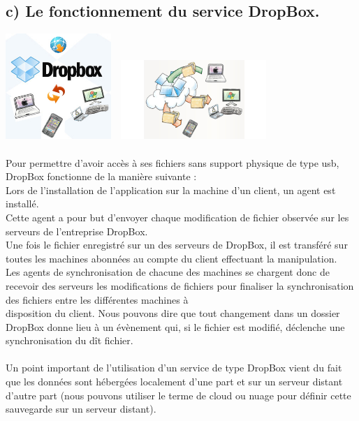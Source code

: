 \documentclass[a4paper, 10pt]{article}
\begin{document}
\subsection*{c) Le fonctionnement du service DropBox.}
\includegraphics[height = 4cm, width = 4cm]{jpg/dropbox_1.png}
\includegraphics[height = 3cm, width = 6cm]{jpg/dropbox_3.jpg}\\ \\
\indent
Pour permettre d'avoir accès à ses fichiers sans support physique de type usb, DropBox fonctionne de la manière suivante :\\
Lors de l'installation de l'application sur la machine d'un client, un agent est installé.\\
Cette agent a pour but d'envoyer chaque modification de fichier observée sur les serveurs de l'entreprise DropBox.\\
Une fois le fichier enregistré sur un des serveurs de DropBox, il est transféré sur toutes les machines abonnées
au compte du client effectuant la manipulation.\\
Les agents de synchronisation de chacune des machines se chargent donc de recevoir des serveurs les modifications de fichiers pour
finaliser la synchronisation des fichiers entre les différentes machines à\\disposition du client.
Nous pouvons dire que tout changement dans un dossier DropBox donne lieu à un évènement qui, si le fichier est modifié,
déclenche une synchronisation du dît fichier.\\ \\
Un point important de l'utilisation d'un service de type DropBox vient du fait que les données sont hébergées localement d'une part
et sur un serveur distant d'autre part (nous pouvons utiliser le terme de cloud ou nuage pour définir cette sauvegarde sur un serveur distant).
\end{document}
